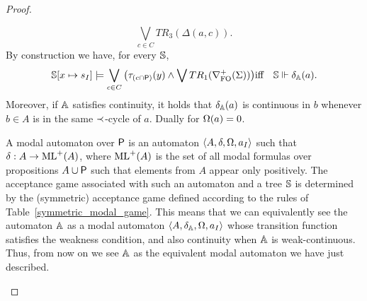 \begin{proof}
\begin{pfclaim}
 \[
 \bigvee_{c \in C} TR_3(\Delta(a,c)).
 \]
By construction we have, for every $\mathbb{S}$,
%
    \begin{eqnarray*}
    \model[x\mapsto s_I] \models \bigvee_{c \in C} \big (\tau_{(c \cap \prop)}(y) \land \bigvee TR_1(\posdbnfofo{\Sigma})\big) & \text{iff} &\model \mmodels \delta_\aut(a).
    \end{eqnarray*}
%
Moreover, if $\mathbb{A}$ satisfies continuity, it holds that $\delta_\mathbb{A}(a)$ is continuous in $b$ whenever $b \in A$ is in the same $\prec$-cycle of $a$. Dually for $\Omega(a)=0$.


A modal automaton over $\mathsf{P}$ is an automaton $ \langle{A, \delta, \Omega, a_I}\rangle$ such that $\delta : A \to \mathrm{ML}^+ (A)$, where $\mathrm{ML}^+ (A)$ is the set of all modal formulas over propositions $A \cup \mathsf{P}$ such that elements from $A$ appear only positively.
The acceptance game associated with such an automaton and a tree $\mathbb{S}$ is determined by the (symmetric) acceptance game defined according to the rules of Table~\ref{symmetric_modal_game}.
This means that we can equivalently see the automaton $\mathbb{A}$ as a modal automaton $\langle{A, \delta_\ensuremath\mathbb{A}, \Omega, a_I}\rangle$ whose transition function satisfies the weakness condition, and also continuity when $\mathbb{A}$ is weak-continuous. Thus, from now on we see $\mathbb{A}$ as the equivalent modal automaton we have just described.%


\end{pfclaim}
\end{proof}
